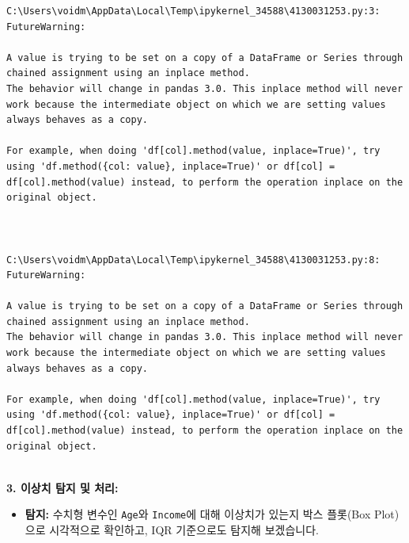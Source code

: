 \documentclass[
  letterpaper,
]{book}
\providecommand{\tightlist}{%
  \setlength{\itemsep}{0pt}\setlength{\parskip}{0pt}}
\begin{document}
\begin{verbatim}
C:\Users\voidm\AppData\Local\Temp\ipykernel_34588\4130031253.py:3: FutureWarning:

A value is trying to be set on a copy of a DataFrame or Series through chained assignment using an inplace method.
The behavior will change in pandas 3.0. This inplace method will never work because the intermediate object on which we are setting values always behaves as a copy.

For example, when doing 'df[col].method(value, inplace=True)', try using 'df.method({col: value}, inplace=True)' or df[col] = df[col].method(value) instead, to perform the operation inplace on the original object.



C:\Users\voidm\AppData\Local\Temp\ipykernel_34588\4130031253.py:8: FutureWarning:

A value is trying to be set on a copy of a DataFrame or Series through chained assignment using an inplace method.
The behavior will change in pandas 3.0. This inplace method will never work because the intermediate object on which we are setting values always behaves as a copy.

For example, when doing 'df[col].method(value, inplace=True)', try using 'df.method({col: value}, inplace=True)' or df[col] = df[col].method(value) instead, to perform the operation inplace on the original object.


\end{verbatim}

\textbf{3. 이상치 탐지 및 처리:}

\begin{itemize}
\tightlist
\item
  \textbf{탐지:} 수치형 변수인 \texttt{Age}와 \texttt{Income}에 대해
  이상치가 있는지 박스 플롯(Box Plot)으로 시각적으로 확인하고, IQR
  기준으로도 탐지해 보겠습니다.
\end{itemize}
\end{document}
